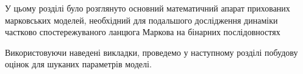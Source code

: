 \chapconclude{\ref{chap: review}}

У цьому розділі було розглянуто основний математичний апарат прихованих марковських моделей, необхідний для подальшого дослідження динаміки частково спостережуваного ланцюга Маркова на бінарних послідовностях 

Використовуючи наведені викладки, проведемо у наступному розділі побудову оцінок для шуканих параметрів моделі.